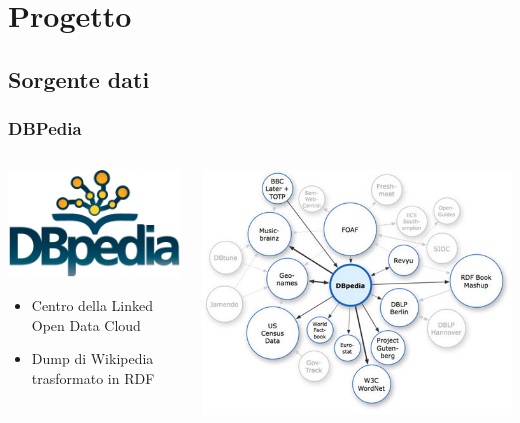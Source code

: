 \documentclass{beamer}
\begin{document}

\section{Progetto}

\subsection{Sorgente dati}

\begin{frame}
\frametitle{DBPedia}
\begin{columns}

\begin{column}{0.4\textwidth}
\vspace{1cm}
\centering\includegraphics[width=.8\textwidth]{figure/dbpedialogo}
\begin{itemize}
\item Centro della Linked Open Data Cloud
\item Dump di Wikipedia trasformato in RDF
\end{itemize}
\end{column}
\begin{column}{0.6\textwidth}
\includegraphics[width=1\textwidth]{figure/AboutDBPedia}
\end{column}
\end{columns}
\end{frame}
\end{document}
